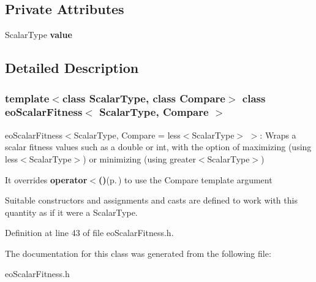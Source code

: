 \subsection*{Private Attributes}
\begin{CompactItemize}
\item 
Scalar\-Type {\bf value}\label{classeo_scalar_fitness_r0}

\end{CompactItemize}


\subsection{Detailed Description}
\subsubsection*{template$<$class Scalar\-Type, class Compare$>$ class eo\-Scalar\-Fitness$<$ Scalar\-Type, Compare $>$}

eo\-Scalar\-Fitness$<$Scalar\-Type, Compare = less$<$Scalar\-Type$>$ $>$: Wraps a scalar fitness values such as a double or int, with the option of maximizing (using less$<$Scalar\-Type$>$) or minimizing (using greater$<$Scalar\-Type$>$) 

It overrides {\bf operator$<$()}{\rm (p.\,\pageref{classeo_scalar_fitness_a6})} to use the Compare template argument

Suitable constructors and assignments and casts are defined to work with this quantity as if it were a Scalar\-Type. 



Definition at line 43 of file eo\-Scalar\-Fitness.h.

The documentation for this class was generated from the following file:\begin{CompactItemize}
\item 
eo\-Scalar\-Fitness.h\end{CompactItemize}
